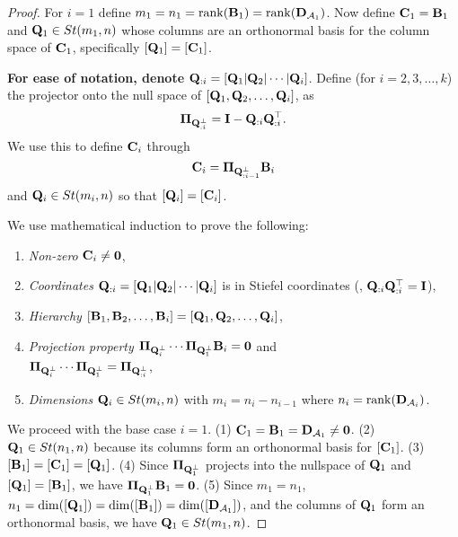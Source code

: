\begin{proof}
    For $i=1$ define $m_1 = n_1 = \mathrm{rank}(\mathbf{B}_1) = \mathrm{rank}(\mathbf{D}_{\mathcal{A}_1})$. Now define $\mathbf{C}_1 = \mathbf{B}_1$ and $\mathbf{Q}_1 \in St(m_1,n)$ whose columns are an orthonormal basis for the column space of $\mathbf{C}_1$, specifically $[\mathbf{Q}_1] = [\mathbf{C}_1]$.
    
    \textbf{For ease of notation, denote} $\mathbf{Q}_{:i} = [\mathbf{Q}_1|\mathbf{Q}_2|\cdots|\mathbf{Q}_{i}]$. Define (for $i=2,3,\dots,k$) the projector onto the null space of $[\mathbf{Q}_1,\mathbf{Q}_2,\dots,\mathbf{Q}_i]$, as 
    \begin{equation}
        \boldsymbol{\Pi}_{\mathbf{Q}_{:i}^\perp} = \mathbf{I} - \mathbf{Q}_{:i}\mathbf{Q}_{:i}^\top.
    \end{equation}
    We use this to define $\mathbf{C}_i$ through 
    \begin{equation}
        \mathbf{C}_i = \boldsymbol{\Pi}_{\mathbf{Q}_{:i-1}^\perp}\mathbf{B}_i
    \end{equation} 
    and $\mathbf{Q}_i \in St(m_i,n)$ so that $[\mathbf{Q}_i] = [\mathbf{C}_i]$.

    We use mathematical induction to prove the following:
        \begin{enumerate}
        \item \emph{Non-zero} $\mathbf{C}_i \neq \bm{0}$,
        \item \emph{Coordinates} $\mathbf{Q}_{:i} = [\mathbf{Q}_1|\mathbf{Q}_2| \cdots | \mathbf{Q}_i]$ is in Stiefel coordinates (\eg, $\mathbf{Q}_{:i}\mathbf{Q}_{:i}^\top = \mathbf{I}$),
        \item \emph{Hierarchy} $[\mathbf{B}_1,\mathbf{B}_2,\dots,\mathbf{B}_i] = [\mathbf{Q}_1,\mathbf{Q}_2, \dots, \mathbf{Q}_i]$,
        \item \emph{Projection property} $\boldsymbol{\Pi}_{\mathbf{Q}_i^\perp} \cdots\boldsymbol{\Pi}_{\mathbf{Q}_1^\perp} \mathbf{B}_i = \bm{0}$ and \\
        $\boldsymbol{\Pi}_{\mathbf{Q}_i^\perp} \cdots\boldsymbol{\Pi}_{\mathbf{Q}_1^\perp}= \boldsymbol{\Pi}_{\mathbf{Q}_{:i}^\perp}$, %
        \item \emph{Dimensions} $\mathbf{Q}_i \in St(m_i,n)$ with $m_i = n_i - n_{i-1}$ where $n_i = \mathrm{rank}(\mathbf{D}_{\mathcal{A}_i})$.
    \end{enumerate}

    We proceed with the base case $i=1$. (1) $\mathbf{C}_1 = \mathbf{B}_1 = \mathbf{D}_{\mathcal{A}_1} \neq \bm{0}$. (2) $\mathbf{Q}_1 \in St(n_1,n)$ because its columns form an orthonormal basis for $[\mathbf{C}_1]$. (3) $[\mathbf{B}_1] = [\mathbf{C}_1] = [\mathbf{Q}_1]$. (4) Since $\boldsymbol{\Pi}_{\mathbf{Q}_1^\perp}$ projects into the nullspace of $\mathbf{Q}_1$ and $[\mathbf{Q}_1] = [\mathbf{B}_1]$, we have $\boldsymbol{\Pi}_{\mathbf{Q}_1^\perp} \mathbf{B}_1 = \bm{0}$. (5) Since $m_1 = n_1$, $n_1 = \mathrm{\dim}([\mathbf{Q}_1]) = \mathrm{dim}([\mathbf{B}_1]) = \mathrm{dim}([\mathbf{D}_{\mathcal{A}_1}])$, and the columns of $\mathbf{Q}_1$ form an orthonormal basis, we have $\mathbf{Q}_1 \in St(m_1,n)$.
    

\end{proof}
